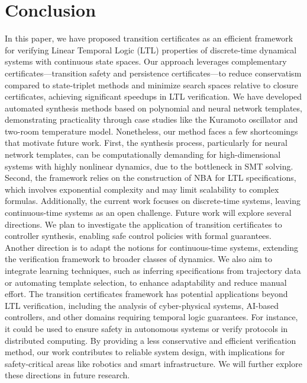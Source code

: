 \section{Conclusion}
\label{sec:conclusion}

In this paper, we have proposed transition certificates as an efficient framework for verifying Linear Temporal Logic (LTL) properties of discrete-time dynamical systems with continuous state spaces. Our approach leverages complementary certificates—transition safety and persistence certificates—to reduce conservatism compared to state-triplet methods and minimize search spaces relative to closure certificates, achieving significant speedups in LTL verification. We have developed automated synthesis methods based on polynomial and neural network templates, demonstrating practicality through case studies like the Kuramoto oscillator and two-room temperature model. Nonetheless, our method faces a few shortcomings that motivate future work. First, the synthesis process, particularly for neural network templates, can be computationally demanding for high-dimensional systems with highly nonlinear dynamics, due to the bottleneck in SMT solving. Second, the framework relies on the construction of NBA for LTL specifications, which involves exponential complexity and may limit scalability to complex formulas. Additionally, the current work focuses on discrete-time systems, leaving continuous-time systems as an open challenge. Future work will explore several directions. We plan to investigate the application of transition certificates to controller synthesis, enabling safe control policies with formal guarantees. Another direction is to adapt the notions for continuous-time systems, extending the verification framework to broader classes of dynamics. We also aim to integrate learning techniques, such as inferring specifications from trajectory data or automating template selection, to enhance adaptability and reduce manual effort. The transition certificates framework has potential applications beyond LTL verification, including the analysis of cyber-physical systems, AI-based controllers, and other domains requiring temporal logic guarantees. For instance, it could be used to ensure safety in autonomous systems or verify protocols in distributed computing. By providing a less conservative and efficient verification method, our work contributes to reliable system design, with implications for safety-critical areas like robotics and smart infrastructure. We will further explore these directions in future research.